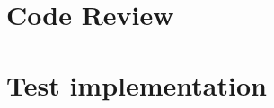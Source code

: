 \documentclass[11pt]{article}
\begin{document}


\pagebreak
\section{Code Review}


\pagebreak
\section{Test implementation}











% 


% 
\end{document}
